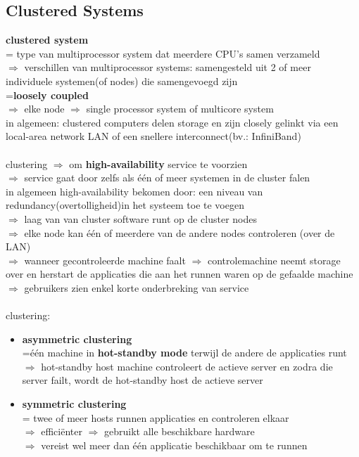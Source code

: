 \documentclass{report}
\begin{document}
\subsection{Clustered Systems}
\textbf{clustered system}
\\= type van multiprocessor system dat meerdere CPU's samen verzameld
\\$\Rightarrow$ verschillen van multiprocessor systems: samengesteld uit 2 of meer individuele systemen(of nodes) die samengevoegd zijn
\\=\textbf{loosely coupled}
\\$\Rightarrow$ elke node $\Rightarrow$ single processor system of multicore system
\\in algemeen: clustered computers delen storage en zijn closely gelinkt via een local-area network LAN of een snellere interconnect(bv.: InfiniBand)
\\
\\ clustering $\Rightarrow$ om \textbf{high-availability} service te voorzien
\\ $\Rightarrow$ service gaat door zelfs als \'e\'en of meer systemen in de cluster falen
\\ in algemeen high-availability bekomen door: een niveau van redundancy(overtolligheid)in het systeem toe te voegen
\\ $\Rightarrow$ laag van van cluster software runt op de cluster nodes
\\$\Rightarrow$ elke node kan \'e\'en of meerdere van de andere nodes controleren (over de LAN)
\\$\Rightarrow$ wanneer gecontroleerde machine faalt $\Rightarrow$ controlemachine neemt storage over en herstart de applicaties die aan het runnen waren op de gefaalde machine
\\$\Rightarrow$ gebruikers zien enkel korte onderbreking van service
\\
\\clustering:
\begin{itemize}
\item \textbf{asymmetric clustering}
\\=\'e\'en machine in \textbf{hot-standby mode} terwijl de andere de applicaties runt
\\$\Rightarrow$ hot-standby host machine controleert de actieve server en zodra die server failt, wordt de hot-standby host de actieve server
\item\textbf{symmetric clustering}
\\= twee of meer hosts runnen applicaties en controleren elkaar
\\$\Rightarrow$ effici\"enter $\Rightarrow$ gebruikt alle beschikbare hardware
\\$\Rightarrow$ vereist wel meer dan \'e\'en applicatie beschikbaar om te runnen
\end{itemize}
\end{document}
